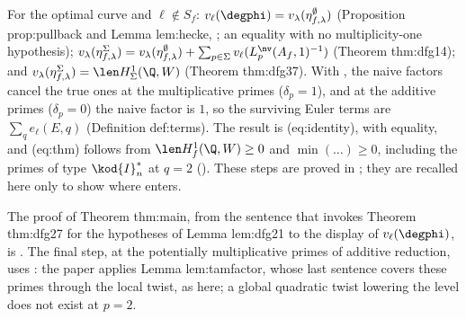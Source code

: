 \begin{remark}\label{rem:blochkato:assembly}
For the optimal curve and $\ell\notin S_f$: $v_\ell(\degphi)=v_\lambda(\eta^\emptyset_{f,\lambda})$ (Proposition prop:pullback and Lemma lem:hecke, ; an equality with no
multiplicity-one hypothesis); $v_\lambda(\eta^\Sigma_{f,\lambda})=v_\lambda(\eta^\emptyset_{f,\lambda})+\sum_{p\in\Sigma}v_\ell(L^{\nv}_p(A_f,1)^{-1})$ (Theorem thm:dfg14); and $v_\lambda(\eta^\Sigma_{f,\lambda})=\len H^1_\Sigma(\Q,W)$
(Theorem thm:dfg37). With , the naive factors cancel the true ones at the multiplicative primes ($\delta_p=1$), and at the additive primes
($\delta_p=0$) the naive factor is $1$, so the surviving Euler terms are $\sum_qe_\ell(E,q)$ (Definition def:terms). The result is (eq:identity), with equality, and (eq:thm)
follows from $\len H^1_f(\Q,W)\ge0$ and $\min(\dots)\ge0$, including the primes of type $\kod{I}_n^*$ at $q=2$ (). These steps are proved in
; they are recalled here only to show where  enters.
\end{remark}

\begin{paperlink}
The proof of Theorem thm:main, from the sentence that invokes Theorem thm:dfg27 for the hypotheses of Lemma lem:dfg21 to the display of $v_\ell(\degphi)$, is . The final step, at the potentially multiplicative primes of additive
reduction, uses : the paper applies Lemma lem:tamfactor, whose last sentence covers these primes through the local twist, as here; a global
quadratic twist lowering the level does not exist at $p=2$.
\end{paperlink}


